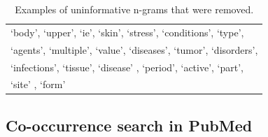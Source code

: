 \documentclass{sig-alternate-05-2015}
\newcommand{\kibitz}[2]{\ifnum\Comments=1\textcolor{#1}{#2}\fi}
\newcommand{\joyce}[1]{\kibitz{purple}      {[Joyce: #1]}}
\newcommand{\jette}[1]{\kibitz{red}      {[Jette: #1]}}
\begin{document}


\begin{table}
\begin{center}
\begin{tabular}{l}
\toprule
`body', `upper', `ie', `skin', `stress', `conditions', `type', \\
`agents', `multiple', `value', `diseases', `tumor', `disorders', \\
`infections', `tissue', `disease' , `period', `active', `part', \\
`site' , `form' \\
\bottomrule
\end{tabular}
\end{center}
\caption{Examples of uninformative n-grams that were removed.}
\label{tab:uninformative-n-gram}
\end{table}

\subsection{Co-occurrence search in PubMed}
\end{document}
